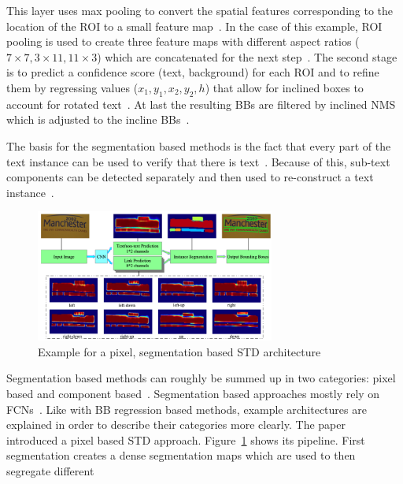 This layer uses max pooling to convert the spatial features corresponding to the location of the
\ac{ROI} to a small feature map~\citep{girshick_fast_2015}.
In the case of this example, \ac{ROI} pooling is used to create three feature maps with different
aspect ratios ($7\times7, 3\times11, 11\times3$) which are concatenated for the next
step~\citep{jiang_r2cnn_2017}.
The second stage is to predict a confidence score (text, background) for each \ac{ROI} and to
refine them by regressing values ($x_1,y_1,x_2,y_2,h$) that allow for inclined boxes to account for
rotated text~\citep{jiang_r2cnn_2017}.
At last the resulting \acp{BB} are filtered by inclined \ac{NMS} which is adjusted to the
incline \acp{BB}~\citep{jiang_r2cnn_2017}.

The basis for the segmentation based methods is the fact that every part of the text instance can
be used to verify that there is text~\citep{long_scene_2021}.
Because of this, sub-text components can be detected separately and then used to re-construct a text
instance~\citep{long_scene_2021}.
\begin{figure}[ht]
    \centering
    \includegraphics[width=0.7\textwidth]{img/STD-seg-based-architecture-Deng-PixelLink-2018.png}
    \caption[Pixel, segmentation based STD architecture]{%
        Example for a pixel, segmentation based STD
        architecture~\citep{deng_pixellink_2018}\label{fig:STD-segbased-pixel-architecture}
    }
\end{figure}
Segmentation based methods can roughly be summed up in two categories: pixel based and component
based~\citep{long_scene_2021}.
Segmentation based approaches mostly rely on \acp{FCN}~\citep{dai_fused_2018}.
Like with \ac{BB} regression based methods, example architectures are explained in order to
describe their categories more clearly.
The paper~\cite{deng_pixellink_2018} introduced a pixel based \ac{STD} approach.
Figure~\ref{fig:STD-segbased-pixel-architecture} shows its pipeline.
First segmentation creates a dense segmentation maps which are used to then segregate different
